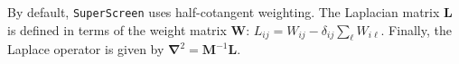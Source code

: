 \documentclass[final,3p,times,twocolumn]{elsarticle}
\newcommand{\inline}[1]{\texttt{#1}\xspace}
\newcommand{\SuperScreen}{\inline{SuperScreen}}
\newcommand{\um}{\mu\mathrm{m}}
\newcounter{bla}
\begin{document}
By default, \SuperScreen uses half-cotangent weighting. The Laplacian matrix $\mathbf{L}$ is defined in terms of the weight matrix $\mathbf{W}$: $L_{ij} = W_{ij} - \delta_{ij}\sum_{\ell}W_{i\ell}$. Finally, the Laplace operator is given by $\mathbf{\nabla}^2 = \mathbf{M}^{-1}\mathbf{L}$.


\end{document}

